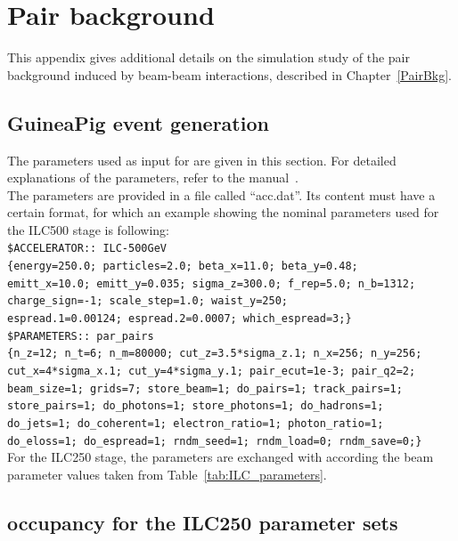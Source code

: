 \chapter{Pair background}
\label{Appendix:Pairs}

This appendix gives additional details on the simulation study of the pair background induced by beam-beam interactions, described in Chapter~\ref{PairBkg}.

\section{GuineaPig event generation}
\label{Appendix:Pairs:GuineaPig}
The parameters used as input for \guineapig are given in this section.
For detailed explanations of the \guineapig parameters, refer to the \guineapig manual~\cite{GuineaPigMan}.
\\The parameters are provided in a file called ``acc.dat''.
Its content must have a certain format, for which an example showing the nominal parameters used for the ILC500 stage is following:\vspace*{0.1cm}\\
\texttt{\$ACCELERATOR:: ILC-500GeV\\
\{energy=250.0; particles=2.0; beta\_x=11.0; beta\_y=0.48;\\
emitt\_x=10.0; emitt\_y=0.035; sigma\_z=300.0; f\_rep=5.0; n\_b=1312;\\
charge\_sign=-1; scale\_step=1.0; waist\_y=250;\\
espread.1=0.00124; espread.2=0.0007; which\_espread=3;\}\\
\$PARAMETERS:: par\_pairs\\
\{n\_z=12; n\_t=6; n\_m=80000; cut\_z=3.5*sigma\_z.1; n\_x=256; n\_y=256;\\
cut\_x=4*sigma\_x.1; cut\_y=4*sigma\_y.1; pair\_ecut=1e-3; pair\_q2=2;\\
beam\_size=1; grids=7; store\_beam=1; do\_pairs=1; track\_pairs=1;\\
store\_pairs=1; do\_photons=1; store\_photons=1; do\_hadrons=1;\\
do\_jets=1; do\_coherent=1; electron\_ratio=1; photon\_ratio=1;\\
do\_eloss=1; do\_espread=1; rndm\_seed=1; rndm\_load=0; rndm\_save=0;\}
}
\vspace*{0.2cm}\\For the ILC250 stage, the parameters are exchanged with according the beam parameter values taken from Table~\ref{tab:ILC_parameters}.
\newpage
\section{\sid occupancy for the ILC250 parameter sets}
\label{Appendix:Pairs:ILC250_occupancy}
